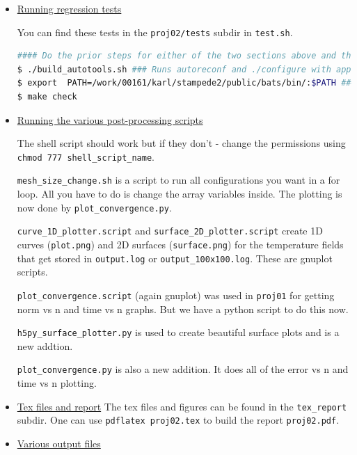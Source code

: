\documentclass[12 pt, final]{article}
\begin{document}
\begin{itemize}
\begin{itemize}
        \item \underline{Running regression tests}

You can find these tests in the \texttt{proj02/tests} subdir in \texttt{test.sh}.
        \begin{lstlisting}[language = bash]
#### Do the prior steps for either of the two sections above and then run this shell script
$ ./build_autotools.sh ### Runs autoreconf and ./configure with appropriate options to link to MASA and GRVY
$ export  PATH=/work/00161/karl/stampede2/public/bats/bin/:$PATH ### Add bats to path to run regression tests
$ make check
        \end{lstlisting}
        
        \item \underline{Running the various post-processing scripts}
        
        The shell script should work but if they don't - change the permissions using \texttt{chmod 777 shell\_script\_name}.
        
        \texttt{mesh\_size\_change.sh} is a script to run all configurations you want in a for loop. All you have to do is change the array variables inside. The plotting is now done by \texttt{plot\_convergence.py}.
        
        \texttt{curve\_1D\_plotter.script} and \texttt{surface\_2D\_plotter.script} create 1D curves (\texttt{plot.png}) and 2D surfaces (\texttt{surface.png}) for the temperature fields that get stored in \texttt{output.log} or \texttt{output\_100x100.log}. These are gnuplot scripts.
        
        \texttt{plot\_convergence.script} (again gnuplot) was used in \texttt{proj01} for getting norm vs n and time vs n graphs. But we have a python script to do this now.
        
        \texttt{h5py\_surface\_plotter.py} is used to create beautiful surface plots and is a new addtion.
        
        \texttt{plot\_convergence.py} is also a new addition. It does all of the error vs n and time vs n plotting.
        
        \item \underline{Tex files and report}
        The tex files and figures can be found in the \texttt{tex\_report} subdir. One can use \texttt{pdflatex proj02.tex} to build the report \texttt{proj02.pdf}.
        
    \item \underline{Various output files}
    

\end{itemize}
\end{itemize}
\end{document}
